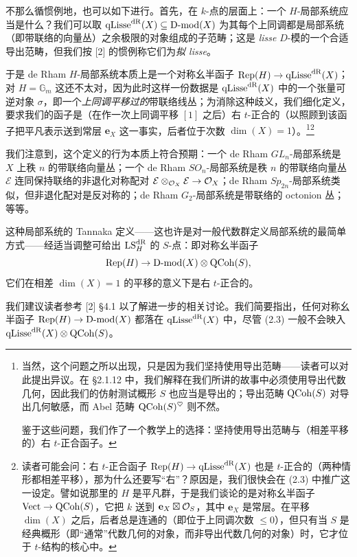不那么循惯例地，也可以如下进行。首先，在 $k$-点的层面上：一个 $H$-局部系统应当是什么？我们可以取 $\mathrm{qLisse}^{\mathrm{dR}}(X) \subseteq \mathrm{D}\text{-}\mathrm{mod}(X)$ 为其每个上同调都是局部系统（即带联络的向量丛）之余极限的对象组成的子范畴；这是 \emph{lisse} $D$-模的一个合适导出范畴，但我们按 [2] 的惯例称它们为\emph{拟 lisse}。

于是 de Rham $H$-局部系统本质上是一个对称幺半函子 $\mathrm{Rep}(H) \to \mathrm{qLisse}^{\mathrm{dR}}(X)$；对 $H = \mathbb{G}_m$ 这还不太对，因为此时这样一份数据是 $\mathrm{qLisse}^{\mathrm{dR}}(X)$ 中的一个张量可逆对象 $\sigma$，即一个\emph{上同调平移过的}带联络线丛；为消除这种歧义，我们细化定义，要求我们的函子是（在作一次上同调平移 $[1]$ 之后）右 $t$-正合的（以照顾到该函子把平凡表示送到常层 $\mathbf{e}_X$ 这一事实，后者位于次数 $\dim(X) = 1$）。\footnote{当然，这个问题之所以出现，只是因为我们坚持使用导出范畴——读者可以对此提出异议。在 §2.1.12 中，我们解释在我们所讲的故事中必须使用导出代数几何，因此我们的仿射测试概形 $S$ 也应当是导出的；导出范畴 $\mathrm{QCoh}(S)$ 对导出几何敏感，而 Abel 范畴 $\mathrm{QCoh}(S)^\heartsuit$ 则不然。

鉴于这些问题，我们作了一个教学上的选择：坚持使用导出范畴与（相差平移的）右 $t$-正合函子。}\footnote{读者可能会问：右 $t$-正合函子 $\mathrm{Rep}(H) \to \mathrm{qLisse}^{\mathrm{dR}}(X)$ 也是 $t$-正合的（两种情形都相差平移），那为什么还要写“右”？原因是，我们很快会在 (2.3) 中推广这一设定。譬如说那里的 $H$ 是平凡群，于是我们谈论的是对称幺半函子 $\mathrm{Vect} \to \mathrm{QCoh}(S)$，它把 $k$ 送到 $\mathbf{e}_X \boxtimes \mathcal{O}_S$，其中 $\mathbf{e}_X$ 是常层。在平移 $\dim(X)$ 之后，后者总是连通的（即位于上同调次数 $\leq 0$），但只有当 $S$ 是经典概形（即“通常”代数几何的对象，而非导出代数几何的对象）时，它才位于 $t$-结构的核心中。}

我们注意到，这个定义的行为本质上符合预期：一个 de Rham $GL_n$-局部系统是 $X$ 上秩 $n$ 的带联络向量丛；一个 de Rham $SO_n$-局部系统是秩 $n$ 的带联络向量丛 $\mathcal{E}$ 连同保持联络的非退化对称配对 $\mathcal{E} \otimes_{\mathcal{O}_X} \mathcal{E} \to \mathcal{O}_X$；de Rham $Sp_{2n}$-局部系统类似，但非退化配对是反对称的；de Rham $G_2$-局部系统是带联络的 octonion 丛；等等。

这种局部系统的 Tannaka 定义——这也许是对一般代数群定义局部系统的最简单方式——经适当调整可给出 $\mathrm{LS}^{\mathrm{dR}}_{H}$ 的 $S$-点：即对称幺半函子
\begin{equation}
  \mathrm{Rep}(H) \to \mathrm{D}\text{-}\mathrm{mod}(X) \otimes \mathrm{QCoh}(S),
\end{equation}
它们在相差 $\dim(X) = 1$ 的平移的意义下是右 $t$-正合的。

我们建议读者参考 [2] §4.1 以了解进一步的相关讨论。我们简要指出，任何对称幺半函子 $\mathrm{Rep}(H) \to \mathrm{D}\text{-}\mathrm{mod}(X)$ 都落在 $\mathrm{qLisse}^{\mathrm{dR}}(X)$ 中，尽管 (2.3) 一般不会映入 $\mathrm{qLisse}^{\mathrm{dR}}(X) \otimes \mathrm{QCoh}(S)$。

